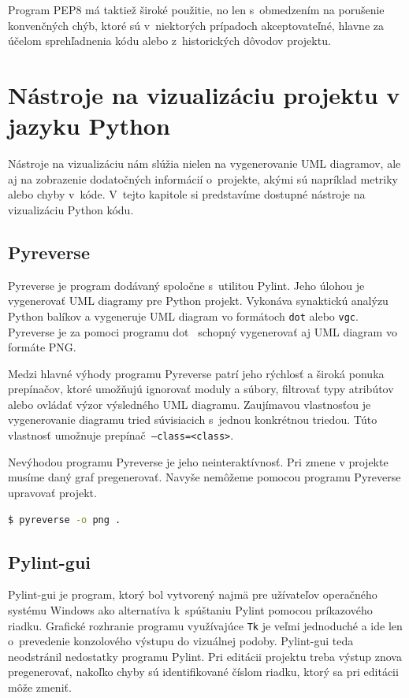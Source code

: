 \documentclass[11pt,oneside,final]{fithesis2}
\begin{document}
    Program PEP8 má taktiež široké použitie, no len s~obmedzením na porušenie konvenčných chýb, ktoré  sú v~niektorých prípadoch akceptovateľné, hlavne za účelom sprehľadnenia kódu alebo z~historických dôvodov projektu.
    	
	
	\section{Nástroje na vizualizáciu projektu v jazyku Python}
		
	Nástroje na vizualizáciu nám slúžia nielen na vygenerovanie UML diagramov, ale aj na zobrazenie dodatočných informácií o~projekte, akými sú napríklad metriky alebo chyby v~kóde. V~tejto kapitole si predstavíme dostupné nástroje na vizualizáciu Python kódu.
	
	\subsection{Pyreverse}
		Pyreverse je program dodávaný spoločne s~utilitou Pylint. Jeho úlohou je vygenerovať UML diagramy pre Python projekt. Vykonáva synaktickú analýzu Python balíkov a vygeneruje UML diagram vo formátoch \texttt{dot} alebo \texttt{vgc}. Pyreverse je za pomoci programu dot~\cite{dotformat} schopný vygenerovať aj UML diagram vo formáte PNG.
		
		Medzi hlavné výhody programu Pyreverse patrí jeho rýchlosť a široká ponuka prepínačov, ktoré umožňujú ignorovať moduly a súbory, filtrovať typy atribútov alebo ovládať výzor výsledného UML diagramu.		
		Zaujímavou vlastnosťou je vygenerovanie diagramu tried súvisiacich s~jednou konkrétnou triedou. Túto vlastnosť umožnuje prepínač\texttt{ --class=<class>}.
		
		Nevýhodou programu Pyreverse je jeho neinteraktívnosť. Pri zmene v projekte musíme daný graf pregenerovať. Navyše nemôžeme pomocou programu Pyreverse upravovať projekt.		
		
\begin{lstlisting}[language=bash]
$ pyreverse -o png .
\end{lstlisting}
 
 
	\subsection{Pylint-gui}
	
	Pylint-gui je program, ktorý bol vytvorený najmä pre užívateľov operačného systému Windows ako alternatíva k~spúštaniu Pylint pomocou príkazového riadku. Grafické rozhranie programu využívajúce \texttt{Tk} je veľmi jednoduché a ide len o~prevedenie konzolového výstupu do vizuálnej podoby. Pylint-gui teda neodstránil nedostatky programu Pylint. Pri editácii projektu treba výstup znova pregenerovať, nakoľko chyby sú identifikované číslom riadku, ktorý sa pri editácii môže zmeniť.
	
\end{document}
